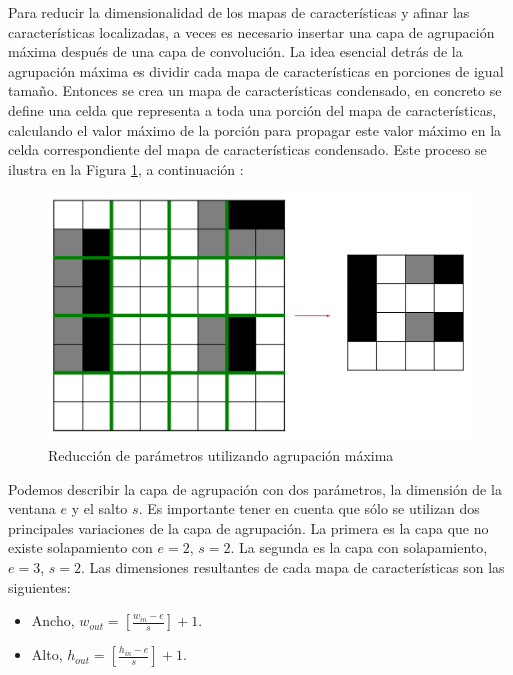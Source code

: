     Para reducir la dimensionalidad de los mapas de características y afinar las características localizadas, a veces es necesario insertar una capa de agrupación máxima después de una capa de convolución. La idea esencial detrás de la agrupación máxima es dividir cada mapa de características en porciones de igual tamaño. Entonces se crea un mapa de características condensado, en concreto se define una celda que representa a toda una porción del mapa de características, calculando el valor máximo de la porción para propagar este valor máximo en la celda correspondiente del mapa de características condensado. Este proceso se ilustra en la Figura \ref{fig:max_pooling}, a continuación \cite{dlBook}:
	\begin{figure}[htp]
        \centering
        \includegraphics[scale=0.4]{chapter3/max_pooling.png}
        \caption{Reducción de parámetros utilizando agrupación máxima}
        \label{fig:max_pooling}
    \end{figure}

    Podemos describir la capa de agrupación con dos parámetros, la dimensión de la ventana $e$ y el salto $s$. Es importante tener en cuenta que sólo se utilizan dos principales variaciones de la capa de agrupación. La primera es la capa que no existe solapamiento con $e=2$, $s=2$. La segunda es la capa con solapamiento, $e=3$, $s=2$. Las dimensiones resultantes de cada mapa de características son las siguientes:

    \begin{itemize}
		\item Ancho, $w_{out}=\left[\frac{w_{in}-e}{s}\right]+1$.
		\item Alto, $h_{out}=\left[\frac{h_{in}-e}{s}\right]+1$.
	\end{itemize}
	
